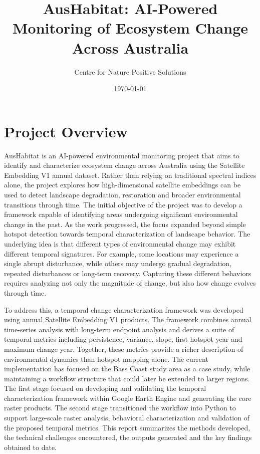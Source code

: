 \documentclass[11pt,a4paper]{article}
\title{AusHabitat: AI-Powered Monitoring of Ecosystem Change Across Australia}
\author{Centre for Nature Positive Solutions}
\date{\today}
\begin{document}
\maketitle

\tableofcontents
\newpage

\section{Project Overview}

AusHabitat is an AI-powered environmental monitoring project that aims to identify and characterize ecosystem change across Australia using the Satellite Embedding V1 annual dataset. Rather than relying on traditional spectral indices alone, the project explores how high-dimensional satellite embeddings can be used to detect landscape degradation, restoration and broader environmental transitions through time. The initial objective of the project was to develop a framework capable of identifying areas undergoing significant environmental change in the past. As the work progressed, the focus expanded beyond simple hotspot detection towards temporal characterization of landscape behavior. The underlying idea is that different types of environmental change may exhibit different temporal signatures. For example, some locations may experience a single abrupt disturbance, while others may undergo gradual degradation, repeated disturbances or long-term recovery. Capturing these different behaviors requires analyzing not only the magnitude of change, but also how change evolves through time.

To address this, a temporal change characterization framework was developed using annual Satellite Embedding V1 products. The framework combines annual time-series analysis with long-term endpoint analysis and derives a suite of temporal metrics including persistence, variance, slope, first hotspot year and maximum change year. Together, these metrics provide a richer description of environmental dynamics than hotspot mapping alone. The current implementation has focused on the Bass Coast study area as a case study, while maintaining a workflow structure that could later be extended to larger regions. The first stage focused on developing and validating the temporal characterization framework within Google Earth Engine and generating the core raster products. The second stage transitioned the workflow into Python to support large-scale raster analysis, behavioral characterization and validation of the proposed temporal metrics. This report summarizes the methods developed, the technical challenges encountered, the outputs generated and the key findings obtained to date.
\end{document}
